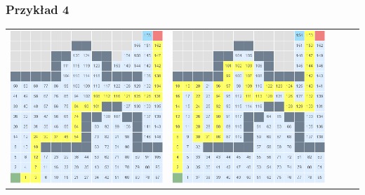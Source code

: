 \documentclass{article}
\begin{document}
\subsubsection{Przykład 4}
\begin{center}
\begin{tabular}{c c c c c}
\includegraphics[scale=0.15]{images/scr25.png} &
\includegraphics[scale=0.15]{images/scr26.png} &

\end{tabular}
\end{center}
\end{document}
